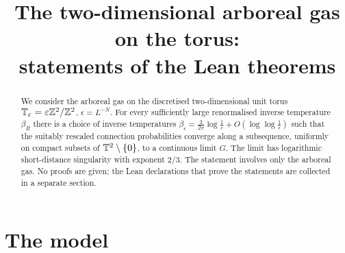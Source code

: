 \documentclass[11pt]{amsart}
\title{The two-dimensional arboreal gas on the torus:\\ statements of the Lean theorems}
\date{}
\numberwithin{equation}{section}
\numberwithin{theorem}{section}
\begin{document}
\sloppy

\begin{abstract}
  We consider the arboreal gas on the discretised two-dimensional unit torus
  $\mathbb{T}_\varepsilon=\varepsilon\mathbb{Z}^2/\mathbb{Z}^2$, $\epsilon=L^{-N}$. For every sufficiently large renormalised
  inverse temperature $\beta_R$ there is a choice of inverse temperatures
  $\beta_\epsilon=\frac{3}{2\pi}\log\frac1\epsilon+O(\log\log\frac1\epsilon)$ such that the suitably
  rescaled connection probabilities converge along a subsequence, uniformly on compact subsets of $\mathbb{T}^2\setminus\{0\}$, to a
  continuous limit $G$. The limit has logarithmic short-distance singularity with exponent $2/3$.
  The statement involves only the arboreal gas. No proofs are given; the Lean declarations
  that prove the statements are collected in a separate section.
\end{abstract}

\maketitle

\section{The model}
\end{document}
